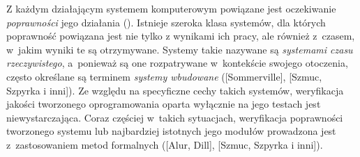 \documentclass[a4paper,12pt]{article}
\begin{document}


Z każdym działającym systemem komputerowym powiązane jest oczekiwanie 
{\em poprawności} jego działania (\cite{journals:cacm:Davis88}). Istnieje szeroka 
klasa systemów, dla których poprawność powiązana jest nie tylko z 
wynikami ich pracy, ale również z~czasem, w~jakim wyniki te są 
otrzymywane. Systemy takie nazywane są {\em systemami czasu 
rzeczywistego}, a~ponieważ są one rozpatrywane  w~kontekście swojego 
otoczenia, często określane są terminem {\em systemy wbudowane} 
([Sommerville], [Szmuc, Szpyrka i inni]). 
\cite{Huzar:etal:Ada95:98}
Ze względu na specyficzne cechy takich systemów, weryfikacja jakości 
tworzonego oprogramowania oparta wyłącznie na jego testach jest 
niewystarczająca. Coraz częściej w~takich sytuacjach, weryfikacja 
poprawności tworzonego systemu lub najbardziej istotnych jego 
modułów prowadzona jest z~zastosowaniem metod formalnych 
([Alur, Dill], [Szmuc, Szpyrka i inni]). 


\end{document}
